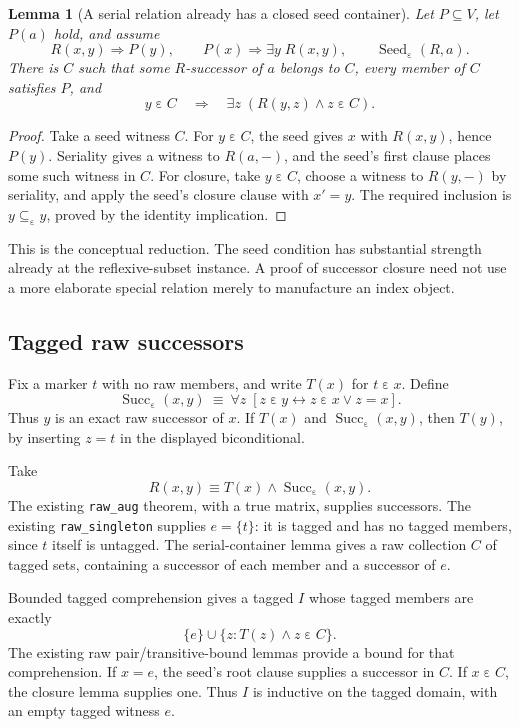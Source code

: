 \documentclass[11pt,letterpaper]{article}
\newtheorem{lemma}[theorem]{Lemma}
\theoremstyle{definition}\newtheorem{definition}[theorem]{Definition}
\newcommand{\Seed}{\operatorname{Seed}}
\newcommand{\Succ}{\operatorname{Succ}}
\newcommand{\mem}{\mathrel{\varepsilon}}
\newcommand{\code}[1]{\texttt{#1}}
\begin{document}
\begin{lemma}[A serial relation already has a closed seed container]
Let $P\subseteq V$, let $P(a)$ hold, and assume
\[
 R(x,y)\Rightarrow P(y),\qquad
 P(x)\Rightarrow\exists y\;R(x,y),\qquad
 \Seed_{\mem}(R,a).
\]
There is $C$ such that some $R$-successor of $a$ belongs to $C$, every member of
$C$ satisfies $P$, and
\[
 y\mem C\quad\Longrightarrow\quad
 \exists z\;(R(y,z)\land z\mem C).
\]
\end{lemma}
\begin{proof}
Take a seed witness $C$. For $y\mem C$, the seed gives $x$ with $R(x,y)$, hence
$P(y)$. Seriality gives a witness to $R(a,-)$, and the seed's first clause places
some such witness in $C$. For closure, take $y\mem C$, choose a witness to
$R(y,-)$ by seriality, and apply the seed's closure clause with $x'=y$.
The required inclusion is $y\subseteq_{\mem}y$, proved by the identity implication.
\end{proof}

This is the conceptual reduction. The seed condition has substantial strength
already at the reflexive-subset instance. A proof of successor closure need not
use a more elaborate special relation merely to manufacture an index object.

\subsection{Tagged raw successors}

Fix a marker $t$ with no raw members, and write $T(x)$ for $t\mem x$. Define
\[
 \Succ_{\mem}(x,y)\ \equiv\
 \forall z\;[z\mem y\longleftrightarrow z\mem x\lor z=x].
\]
Thus $y$ is an exact raw successor of $x$. If $T(x)$ and $\Succ_{\mem}(x,y)$,
then $T(y)$, by inserting $z=t$ in the displayed biconditional.

Take
\[
 R(x,y)\equiv T(x)\land\Succ_{\mem}(x,y).
\]
The existing \code{raw\_aug} theorem, with a true matrix, supplies successors.
The existing \code{raw\_singleton} supplies $e=\{t\}$: it is tagged and has no
tagged members, since $t$ itself is untagged. The serial-container lemma gives a
raw collection $C$ of tagged sets, containing a successor of each member and a
successor of $e$.

Bounded tagged comprehension gives a tagged $I$ whose tagged members are exactly
\[
 \{e\}\cup\{z:T(z)\land z\mem C\}.
\]
The existing raw pair/transitive-bound lemmas provide a bound for that
comprehension. If $x=e$, the seed's root clause supplies a successor in $C$.
If $x\mem C$, the closure lemma supplies one. Thus $I$ is inductive on the tagged
domain, with an empty tagged witness $e$.
\end{document}
